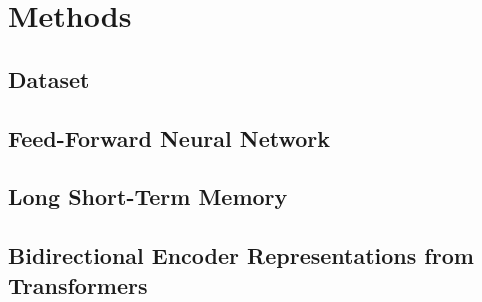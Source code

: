 \section{Methods}
\label{sec:methods}

\subsection{Dataset}

\subsection{Feed-Forward Neural Network}

\subsection{Long Short-Term Memory}

\subsection{Bidirectional Encoder Representations from Transformers}